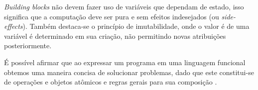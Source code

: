 \documentclass[10pt, conference]{IEEEtran}
\begin{document}
\textit{Building blocks} n\~ao devem fazer uso de vari\'aveis que dependam de estado, isso significa que a computa\c{c}\~ao deve ser pura e sem efeitos indesejados (ou \textit{side-effects}). Tamb\'em destaca-se o princ\'ipio de imutabilidade, onde o valor \'e de uma vari\'avel \'e determinado em sua cria\c{c}\~ao, n\~ao permitindo novas atribui\c{c}\~oes posteriormente.

\'E poss\'ivel afirmar que ao expressar um programa em uma linguagem funcional obtemos uma maneira concisa de solucionar problemas, dado que este constitui-se de opera\c{c}\~oes e objetos at\^omicos e regras gerais para sua composi\c{c}\~ao \cite{michaelson2011introduction}.



\end{document}
